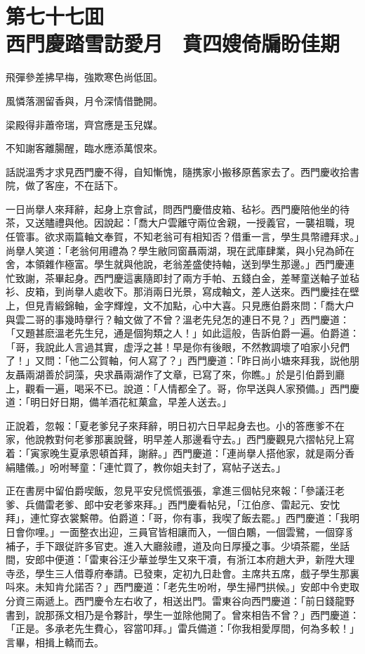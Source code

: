 
\chapter*{第七十七囬　\\西門慶踏雪訪愛月　賁四嫂倚牖盼佳期}


\begin{myquote}
飛彈參差拂早梅，強欺寒色尚低囬。

風憐落溷留香與，月令深情借艷開。

梁殿得非蕭帝瑞，齊宫應是玉兒媒。

不知謝客離腸醒，臨水應添萬恨來。
\end{myquote}

話説溫秀才求見西門慶不得，自知慚愧，隨携家小搬移原舊家去了。西門慶收拾書院，做了客座，不在話下。

一日尚擧人來拜辭，起身上京會試，問西門慶借皮箱、毡衫。西門慶陪他坐的待茶，又送贐禮與他。因說起：「喬大户雲離守兩位舍親，一授義官，一襲祖職，現任管事。欲求兩篇軸文奉賀，不知老翁可有相知否？借重一言，學生具幣禮拜求。」尚擧人笑道：「老翁何用禮為？學生敝同窗聶兩湖，現在武庫肆業，與小兒為師在舍，本領雜作極富。學生就與他說，老翁差盛使持軸，送到學生那邊。」西門慶連忙致謝，茶畢起身。西門慶這裏隨即封了兩方手帕、五錢白金，差琴童送軸子並毡衫、皮箱，到尚擧人處收下。那消兩日光景，寫成軸文，差人送來。西門慶挂在壁上，但見青緞錦軸，金字輝煌，文不加點，心中大喜。只見應伯爵來問：「喬大户與雲二哥的事幾時擧行？軸文做了不曾？溫老先兒怎的連日不見？」西門慶道：「又題甚麽溫老先生兒，通是個狗類之人！」如此這般，告訴伯爵一遍。伯爵道：「哥，我說此人言過其實，虚浮之甚！早是你有後眼，不然教調壞了咱家小兒們了！」又問：「他二公賀軸，何人寫了？」西門慶道：「昨日尚小塘來拜我，説他朋友聶兩湖善於詞藻，央求聶兩湖作了文章，已寫了來，你瞧。」於是引伯爵到廳上，觀看一遍，喝采不已。說道：「人情都全了。哥，你早送與人家預備。」西門慶道：「明日好日期，備羊酒花紅菓盒，早差人送去。」

正說着，忽報：「夏老爹兒子來拜辭，明日初六日早起身去也。小的答應爹不在家，他說教對何老爹那裏說聲，明早差人那邊看守去。」西門慶觀見六摺帖兒上寫着：「寅家晚生夏承恩頓首拜，謝辭。」西門慶道：「連尚擧人搭他家，就是兩分香絹贐儀。」吩咐琴童：「連忙買了，教你姐夫封了，寫帖子送去。」

正在書房中留伯爵喫飯，忽見平安兒慌慌張張，拿進三個帖兒來報：「參議汪老爹、兵備雷老爹、郎中安老爹來拜。」西門慶看帖兒，「江伯彦、雷起元、安忱拜」，連忙穿衣裳繫帶。伯爵道：「哥，你有事，我喫了飯去罷。」西門慶道：「我明日會你哩。」一面整衣出迎，三員官皆相讓而入，一個白鷴，一個雲鷺，一個穿豸補子，手下跟従許多官吏。進入大廳敍禮，道及向日厚擾之事。少頃茶罷，坐話間，安郎中便道：「雷東谷汪少華並學生又來干凟，有浙江本府趙大尹，新陞大理寺丞，學生三人借尊府奉請。已發柬，定初九日赴會。主席共五席，戲子學生那裏呌來。未知肯允諾否？」西門慶道：「老先生吩咐，學生掃門拱候。」安郎中令吏取分資三兩遞上。西門慶令左右收了，相送出門。雷東谷向西門慶道：「前日錢龍野書到，說那孫文相乃是令夥計，學生一並除他開了。曾來相告不曾？」西門慶道：「正是。多承老先生費心，容當叩拜。」雷兵備道：「你我相愛厚間，何為多較！」言畢，相揖上轎而去。

